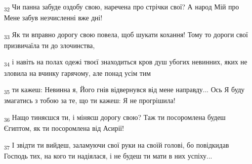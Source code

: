 \begin{tcolorbox}
\textsubscript{32} Чи панна забуде оздобу свою, наречена про стрічки свої? А народ Мій про Мене забув незчисленні вже дні!
\end{tcolorbox}
\begin{tcolorbox}
\textsubscript{33} Як ти вправно дорогу свою повела, щоб шукати кохання! Тому то дороги свої призвичаїла ти до злочинства,
\end{tcolorbox}
\begin{tcolorbox}
\textsubscript{34} і навіть на полах одежі твоєї знаходиться кров душ убогих невинних, яких не зловила на вчинку гарячому, але понад усім тим
\end{tcolorbox}
\begin{tcolorbox}
\textsubscript{35} ти кажеш: Невинна я, Його гнів відвернувся від мене направду... Ось Я буду змагатись з тобою за те, що ти кажеш: Я не прогрішила!
\end{tcolorbox}
\begin{tcolorbox}
\textsubscript{36} Нащо тиняєшся ти, і міняєш дорогу свою? Таж ти посоромлена будеш Єгиптом, як ти посоромлена від Асирії!
\end{tcolorbox}
\begin{tcolorbox}
\textsubscript{37} І звідти ти вийдеш, заламуючи свої руки на своїй голові, бо повідкидав Господь тих, на кого ти надіялася, і не будеш ти мати в них успіху...
\end{tcolorbox}
